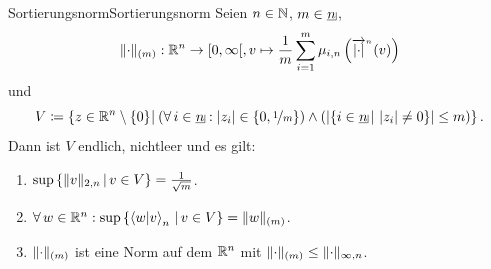 \begin{lemma}{Sortierungsnorm}{Sortierungsnorm}
Seien $n \in \mathbb{N}$, $m \in \haken n$, 
\[\lVert\cdot\rVert_{(m)}: \mathbb{R}^n \rightarrow [0, \infty[,
 v\mapsto\frac 1m\sum_{i=1}^m \mu_{i, n}\left({\overrightarrow{\left|\cdot\right|}}^{{}_n}(v) \right)\]
und
\[V\coloneqq  \mengea{z \in \R^n\setminus\meng 0}
    {\left(\forall\, i \in \haken n: \abs{z_i} \in\meng{0,\nicefrac 1m} \right)
    \wedge \left(\abs{\menge{i \in \haken n}{\abs{z_i} \neq 0}}\le m \right)}
    \text.\]
Dann ist $V$ endlich, nichtleer und es gilt:
\begin{enumerate}[(1)]
	\item \label{Sortierungsnorm1}
	$\sup \left\{\lVert v\rVert_{2, n}\,|\,v \in V\right\} = \frac 1 {\sqrt m}$.
	\item \label{Sortierungsnorm2}
	$\forall\, w \in \mathbb{R}^n: \sup\left\{\left\langle w |v\right\rangle_n\,|\,v \in V\right\} = \lVert w\rVert _{(m)}$.
	\item \label{Sortierungsnorm3}
	$\lVert\cdot\rVert_{(m)}$ ist eine Norm auf dem $\mathbb{R}^n$ mit $\lVert\cdot\rVert_{(m)} \le
	\lVert\cdot\rVert_{\infty, n}$.
\end{enumerate}
\end{lemma}

